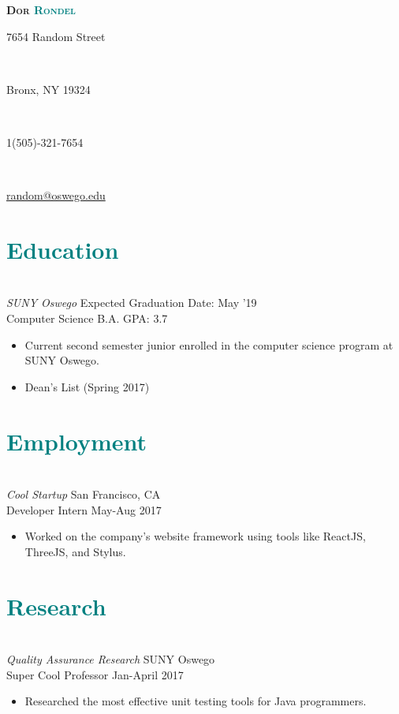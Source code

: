 \documentclass[11pt]{article}
\begin{document}
\setlength{\voffset}{-0.5in}

\centerline{
    \Huge{
        \textsc{
            \textbf{
                Dor \textcolor{teal}{Rondel}}
            }
    }
} 
\hfill \break 
\centerline{7654 Random Street} \\
\centerline{Bronx, NY 19324} \\
\centerline{1(505)-321-7654} \\
\centerline{
    \href{mailto:random@oswego.edu}{random@oswego.edu}
}

\section*{\textcolor{teal}{Education}}
\hline
\vspace{4px}
\hfill
\\
\textit{
    \large{SUNY Oswego}
}
\hfill
\small{Expected Graduation Date: May '19} \\
\small{Computer Science B.A.}
\hfill
GPA: 3.7  
\begin{itemize}
    \item Current second semester junior enrolled in the computer science program at SUNY Oswego.
    \item Dean's List (Spring 2017)
\end{itemize}

\section*{\textcolor{teal}{Employment}}
\hline
\vspace{4px}
\hfill \\
\textit{
    \large{Cool Startup}
}
\hfill
\small{San Francisco, CA} \\
\small{Developer Intern}
\hfill
May-Aug 2017 
\begin{itemize}
    \item Worked on the company's website framework using tools like ReactJS, ThreeJS, and Stylus.
\end{itemize}

\section*{\textcolor{teal}{Research}}
\hline
\vspace{4px}
\hfill \\
\textit{
    \large{Quality Assurance Research}
}
\hfill
\small{SUNY Oswego} \\
\small{Super Cool Professor}
\hfill
Jan-April 2017 
\begin{itemize}
    \item Researched the most effective unit testing tools for Java programmers.
\end{itemize}
\end{document}
